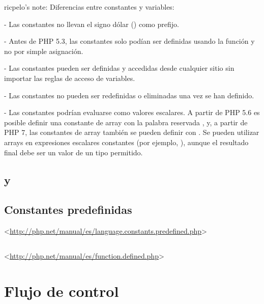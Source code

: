 \documentclass[a4paper,11pt,spanish]{sphinxmanual}
\begin{document}
\begin{DUlineblock}{0em}
\item[] ricpelo's note: Diferencias entre constantes y variables:
\item[] - Las constantes no llevan el signo dólar (\sphinxcode{\$}) como prefijo.
\item[] - Antes de PHP 5.3, las constantes solo podían ser definidas usando la
función  y no por simple asignación.
\item[] - Las constantes pueden ser definidas y accedidas desde cualquier
sitio sin importar las reglas de acceso de variables.
\item[] - Las constantes no pueden ser redefinidas o eliminadas una vez se han
definido.
\item[] - Las constantes podrían evaluarse como valores escalares. A partir de
PHP 5.6 es posible definir una constante de array con la palabra
reservada , y, a partir de PHP 7, las constantes de array
también se pueden definir con . Se pueden utilizar arrays
en expresiones escalares constantes (por ejemplo,
), aunque el resultado final debe ser
un valor de un tipo permitido.
\end{DUlineblock}


\subsection{ y }
\label{\detokenize{php:define-y-const}}

\subsection{Constantes predefinidas}
\label{\detokenize{php:constantes-predefinidas}}
\textless{}\url{http://php.net/manual/es/language.constants.predefined.php}\textgreater{}


\subsection{}
\label{\detokenize{php:defined}}
\textless{}\url{http://php.net/manual/es/function.defined.php}\textgreater{}


\section{Flujo de control}
\label{\detokenize{php:flujo-de-control}}
\end{document}
